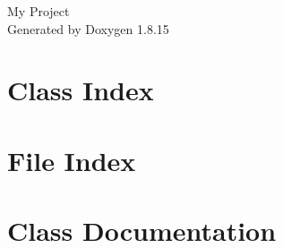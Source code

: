 \documentclass[twoside]{book}
\newcommand{\+}{\discretionary{\mbox{\scriptsize$\hookleftarrow$}}{}{}}
\newcommand{\clearemptydoublepage}{%
  \newpage{\pagestyle{empty}\cleardoublepage}%
}
\begin{document}
\hypersetup{pageanchor=false,
             bookmarksnumbered=true,
             pdfencoding=unicode
            }
\begin{titlepage}
\vspace*{7cm}
\begin{center}%
{\Large My Project }\\
\vspace*{1cm}
{\large Generated by Doxygen 1.8.15}\\
\end{center}
\end{titlepage}
\clearemptydoublepage
{}
\tableofcontents
\clearemptydoublepage
{}
\hypersetup{pageanchor=true}

\chapter{Class Index}

\chapter{File Index}

\chapter{Class Documentation}































\end{document}
